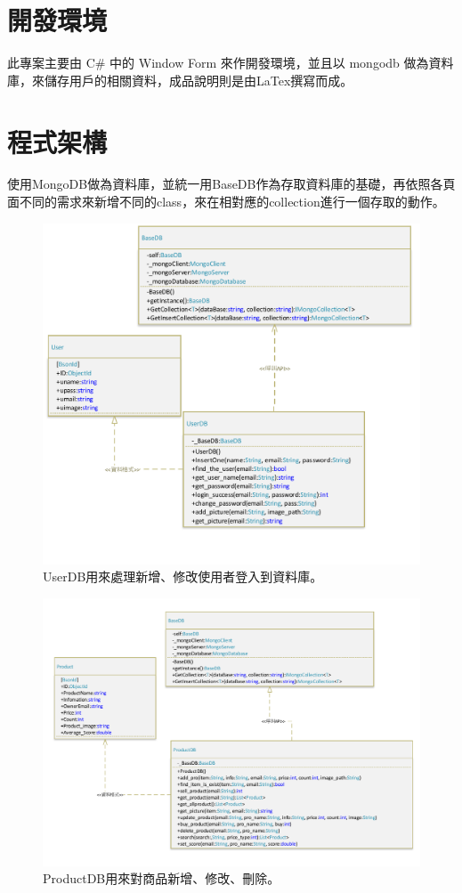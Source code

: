 \documentclass{scrreprt}
\begin{document}
\begin{CJK}{UTF8}{bkai}
\section{開發環境}
\qquad 此專案主要由 C\# 中的 Window Form 來作開發環境，並且以 mongodb 做為資料庫，來儲存用戶的相關資料，成品說明則是由LaTex撰寫而成。

\section{程式架構}
\qquad 使用MongoDB做為資料庫，並統一用BaseDB作為存取資料庫的基礎，再依照各頁面不同的需求來新增不同的class，來在相對應的collection進行一個存取的動作。\\

\begin{figure}
	\includegraphics[width=\textwidth]{UserDB.pdf}
	\caption{UserDB用來處理新增、修改使用者登入到資料庫。}
\end{figure}

\begin{figure}
	\includegraphics[width=\textwidth]{ProductDB.pdf}
	\caption{ProductDB用來對商品新增、修改、刪除。}
\end{figure}


\end{CJK}
\end{document}
